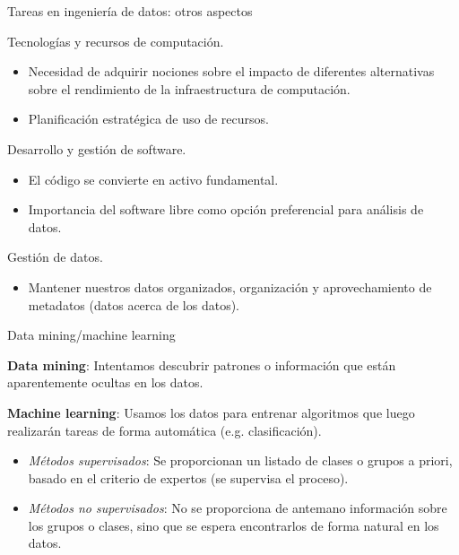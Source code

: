 
\begin{frame}{Tareas en ingeniería de datos: otros aspectos}
 \begin{wideitemize}
  \item Tecnologías y recursos de computación.
  \begin{itemize}
   \item Necesidad de adquirir nociones sobre el impacto de diferentes alternativas
   sobre el rendimiento de la infraestructura de computación.
   \item Planificación estratégica de uso de recursos.
  \end{itemize}

  \item Desarrollo y gestión de software.
  \begin{itemize}
   \item El código se convierte en activo fundamental.
   \item Importancia del software libre como opción preferencial para análisis
   de datos.
  \end{itemize}

  \item Gestión de datos.
  \begin{itemize}
   \item Mantener nuestros datos organizados, organización y aprovechamiento de
   metadatos (datos acerca de los datos).
  \end{itemize}
 \end{wideitemize}

\end{frame}


\begin{frame}{Data mining/machine learning}
 \begin{wideitemize}
  \item \textbf{Data mining}: Intentamos descubrir patrones o información que están aparentemente
  ocultas en los datos.
  \item \textbf{Machine learning}: Usamos los datos para entrenar algoritmos que luego
  realizarán tareas de forma automática (e.g. clasificación).
  \begin{itemize}
   \item \textit{Métodos supervisados}: Se proporcionan un listado de clases o grupos
   a priori, basado en el criterio de expertos (se supervisa el proceso).
   \item \textit{Métodos no supervisados}: No se proporciona de antemano información sobre
   los grupos o clases, sino que se espera encontrarlos de forma natural en los
   datos.
  \end{itemize}

 \end{wideitemize}

\end{frame}

